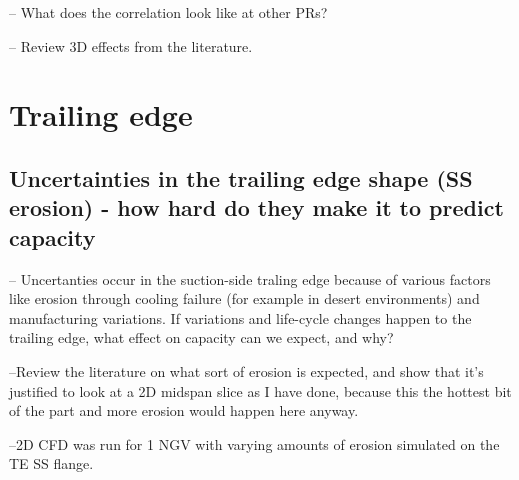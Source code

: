 \documentclass[11pt, twoside]{report}
\begin{document}
-- What does the correlation look like at other PRs?

-- Review 3D effects from the literature.




\chapter{Trailing edge}





\section{Uncertainties in the trailing edge shape (SS erosion) - how hard do they make it to predict capacity}

-- Uncertanties occur in the suction-side traling edge because of various factors like erosion through cooling failure (for example in desert environments) and manufacturing variations. If variations and life-cycle changes happen to the trailing edge, what effect on capacity can we expect, and why?

--Review the literature on what sort of erosion is expected, and show that it’s justified to look at a 2D midspan slice as I have done, because this the hottest bit of the part and more erosion would happen here anyway.

--2D CFD was run for 1 NGV with varying amounts of erosion simulated on the TE SS flange.
\end{document}
